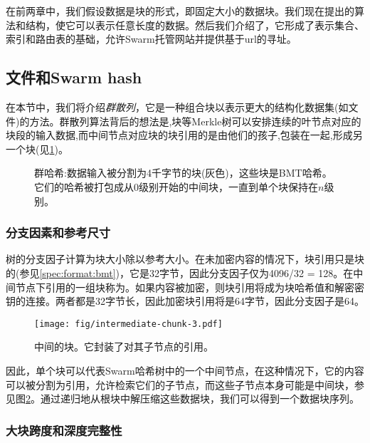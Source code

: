 \green{}

在前两章中，我们假设数据是块的形式，即固定大小的数据块。我们现在提出的算法和结构，使它可以表示任意长度的数据。然后我们介绍了，它形成了表示集合、索引和路由表的基础，允许Swarm托管网站并提供基于url的寻址。

\subsection{文件和Swarm hash\statusgreen}\label{sec:files}

在本节中，我们将介绍\emph{群散列}，它是一种组合块以表示更大的结构化数据集(如文件)的方法。群散列算法背后的想法是,块等Merkle树可以安排连续的叶节点对应的块段的输入数据,而中间节点对应块的块引用的是由他们的孩子,包装在一起,形成另一个块(见\ref{fig:Swarm-hash})。 



\begin{figure}[htbp]
\centering
\resizebox{1\textwidth}{!}{
    
}
\caption[群散列\statusgreen]{群哈希:数据输入被分割为4千字节的块(灰色)，这些块是BMT哈希。它们的哈希被打包成从$0$级别开始的中间块，一直到单个块保持在$n$级别。 }
\label{fig:Swarm-hash}
\end{figure}

\subsubsection{分支因素和参考尺寸}

树的分支因子计算为块大小除以参考大小。在未加密内容的情况下，块引用只是块的(参见\ref{spec:format:bmt})，它是32字节，因此分支因子仅为4096/32 = 128。在中间节点下引用的一组块称为。如果内容被加密，则块引用将成为块哈希值和解密密钥的连接。两者都是32字节长，因此加密块引用将是64字节，因此分支因子是64。 


\begin{figure}[htbp]
\centering
\texttt{[image: fig/intermediate-chunk-3.pdf]}
\caption[中间块\statusgreen]{中间的块。它封装了对其子节点的引用。}
\label{fig:intermediate-chunk}
\end{figure}

因此，单个块可以代表Swarm哈希树中的一个中间节点，在这种情况下，它的内容可以被分割为引用，允许检索它们的子节点，而这些子节点本身可能是中间块，参见图\ref{fig:intermediate-chunk}。通过递归地从根块中解压缩这些数据块，我们可以得到一个数据块序列。 

 \subsubsection{大块跨度和深度完整性}


